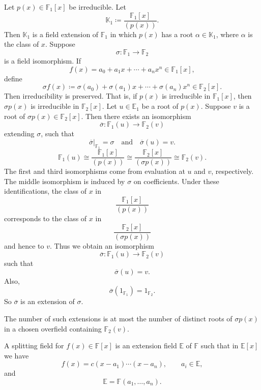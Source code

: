 \begin{theorem}{
    Let $p(x)\in \mathbb{F}_1[x]$ be irreducible.
    Let
    \[
        \mathbb{K}_1\coloneqq \frac{\mathbb{F}_1[x]}{(p(x))}.
    \]
    Then $\mathbb{K}_1$ is a field extension of $\mathbb{F}_1$ in which $p(x)$ has a root $\alpha\in \mathbb{K}_1$, where $\alpha$ is the class of $x$.
    Suppose
    \[
        \sigma:\mathbb{F}_1\to \mathbb{F}_2
    \]
    is a field isomorphism.
    If
    \[
        f(x)=a_0+a_{1}x+\cdots+a_{n}x^n\in \mathbb{F}_1[x],
    \]
    define
    \[
        \sigma f(x)\coloneqq \sigma(a_0)+\sigma(a_1)x+\cdots+\sigma(a_n)x^n\in \mathbb{F}_2[x].
    \]
    Then irreducibility is preserved.
    That is, if $p(x)$ is irreducible in $\mathbb{F}_1[x]$, then $\sigma p(x)$ is irreducible in $\mathbb{F}_2[x]$.
    Let $u\in \mathbb{E}_1$ be a root of $p(x)$.
    Suppose $v$ is a root of $\sigma p(x)\in \mathbb{F}_2[x]$.
    Then there exists an isomorphism
    \[
        \overline{\sigma}:\mathbb{F}_1(u)\to \mathbb{F}_2(v)
    \]
    extending $\sigma$, such that
    \[
        \overline{\sigma}|_{\mathbb{F}_1}=\sigma
        \quad\text{and}\quad
        \overline{\sigma}(u)=v.
    \]
}
\[
    \mathbb{F}_1(u)\cong \frac{\mathbb{F}_1[x]}{(p(x))}
    \cong \frac{\mathbb{F}_2[x]}{(\sigma p(x))}
    \cong \mathbb{F}_2(v).
\]
The first and third isomorphisms come from evaluation at $u$ and $v$, respectively.
The middle isomorphism is induced by $\sigma$ on coefficients.
Under these identifications, the class of $x$ in
\[
    \frac{\mathbb{F}_1[x]}{(p(x))}
\]
corresponds to the class of $x$ in
\[
    \frac{\mathbb{F}_2[x]}{(\sigma p(x))}
\]
and hence to $v$.
Thus we obtain an isomorphism
\[
    \overline{\sigma}:\mathbb{F}_1(u)\to \mathbb{F}_2(v)
\]
such that
\[
    \overline{\sigma}(u)=v.
\]
Also,
\[
    \overline{\sigma}(1_{\mathbb{F}_1})=1_{\mathbb{F}_2}.
\]
So $\overline{\sigma}$ is an extension of $\sigma$.
\end{theorem}

\begin{corollary}{
    The number of such extensions is at most the number of distinct roots of $\sigma p(x)$ in a chosen overfield containing $\mathbb{F}_2(v)$.
}
\end{corollary}

\begin{definition}
    A splitting field for $f(x)\in \mathbb{F}[x]$ is an extension field $\mathbb{E}$ of $\mathbb{F}$ such that in $\mathbb{E}[x]$ we have
    \[
        f(x)=c(x-a_1)\cdots(x-a_n),
        \qquad a_i\in \mathbb{E},
    \]
    and
    \[
        \mathbb{E}=\mathbb{F}(a_1,\ldots,a_n).
    \]
\end{definition}

